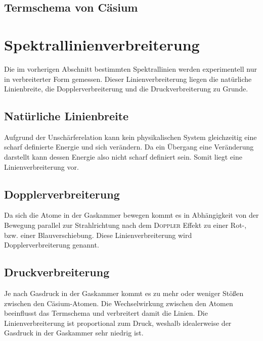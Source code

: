 \documentclass[../bericht.tex]{subfiles}
\begin{document}
      \subsection{Termschema von Cäsium}
      \label{subsec:termschema-caesium}




    \section{Spektrallinienverbreiterung}
    \label{sec:linienverbreiterung}

      Die im vorherigen Abschnitt bestimmten Spektrallinien werden experimentell nur in verbreiterter Form gemessen. Dieser Linienverbreiterung liegen die natürliche Linienbreite, die Dopplerverbreiterung und die Druckverbreiterung zu Grunde.

      \subsection{Natürliche Linienbreite}
      \label{subsec:natuerliche-linienbreite}

        Aufgrund der Unschärferelation kann kein physikalischen System gleichzeitig eine scharf definierte Energie und sich verändern. Da ein Übergang eine Veränderung darstellt kann dessen Energie also nicht scharf definiert sein. Somit liegt eine Linienverbreiterung vor.


      \subsection{Dopplerverbreiterung}
      \label{subsec:dopplerverbreiterung}

        Da sich die Atome in der Gaskammer bewegen kommt es in Abhängigkeit von der Bewegung parallel zur Strahlrichtung nach dem \textsc{Doppler} Effekt zu einer Rot-, bzw. einer Blauverschiebung. Diese Linienverbreiterung wird Dopplerverbreiterung genannt.


      \subsection{Druckverbreiterung}
      \label{subsec:druckverbreiterung}

        Je nach Gasdruck in der Gaskammer kommt es zu mehr oder weniger Stößen zwischen den Cäsium-Atomen. Die Wechselwirkung zwischen den Atomen beeinflusst das Termschema und verbreitert damit die Linien. Die Linienverbreiterung ist proportional zum Druck, weshalb idealerweise der Gasdruck in der Gaskammer sehr niedrig ist.
\end{document}

